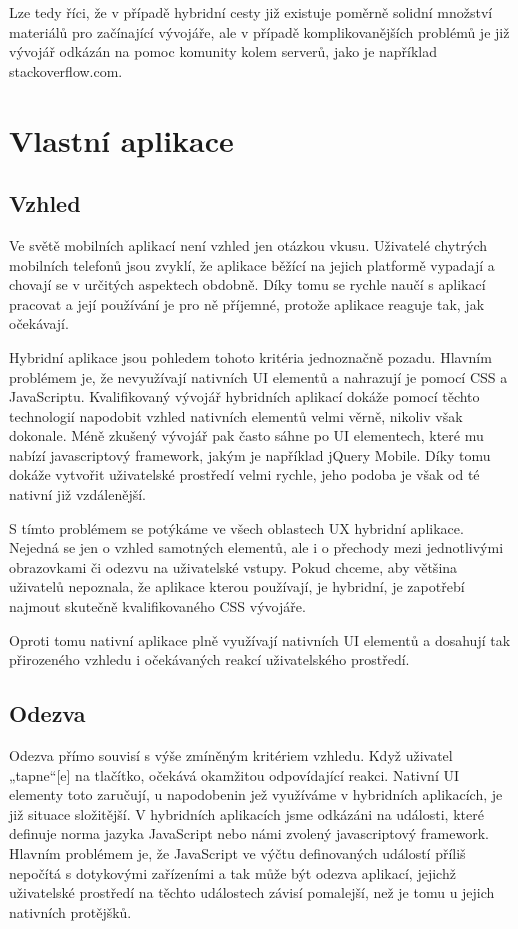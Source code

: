 Lze tedy říci, že v případě hybridní cesty již existuje poměrně solidní množství materiálů pro začínající vývojáře, ale v případě komplikovanějších problémů je již vývojář odkázán na pomoc komunity kolem serverů, jako je například stackoverflow.com.

\section{Vlastní aplikace}
\subsection{Vzhled}
Ve světě mobilních aplikací není vzhled jen otázkou vkusu. Uživatelé chytrých mobilních telefonů jsou zvyklí, že aplikace běžící na jejich platformě vypadají a chovají se v určitých aspektech obdobně. Díky tomu se rychle naučí s aplikací pracovat a její používání je pro ně příjemné, protože aplikace reaguje tak, jak očekávají.

Hybridní aplikace jsou pohledem tohoto kritéria jednoznačně pozadu. Hlavním problémem je, že nevyužívají nativních UI elementů a nahrazují je pomocí CSS a JavaScriptu. Kvalifikovaný vývojář hybridních aplikací dokáže pomocí těchto technologií napodobit vzhled nativních elementů velmi věrně, nikoliv však dokonale. Méně zkušený vývojář pak často sáhne po UI elementech, které mu nabízí javascriptový framework, jakým je například jQuery Mobile. Díky tomu dokáže vytvořit uživatelské prostředí velmi rychle, jeho podoba je však od té nativní již vzdálenější.

S tímto problémem se potýkáme ve všech oblastech UX hybridní aplikace. Nejedná se jen o vzhled samotných elementů, ale i o přechody mezi jednotlivými obrazovkami či odezvu na uživatelské vstupy. Pokud chceme, aby většina uživatelů nepoznala, že aplikace kterou používají, je hybridní, je zapotřebí najmout skutečně kvalifikovaného CSS vývojáře.

Oproti tomu nativní aplikace plně využívají nativních UI elementů a dosahují tak přirozeného vzhledu i očekávaných reakcí uživatelského prostředí.

\subsection{Odezva}
Odezva přímo souvisí s výše zmíněným kritériem vzhledu. Když uživatel „tapne“[e] na tlačítko, očekává okamžitou odpovídající reakci. Nativní UI elementy toto zaručují, u napodobenin jež využíváme v hybridních aplikacích, je již situace složitější. V hybridních aplikacích jsme odkázáni na události, které definuje norma jazyka JavaScript nebo námi zvolený javascriptový framework. Hlavním problémem je, že JavaScript ve výčtu definovaných událostí příliš nepočítá s dotykovými zařízeními a tak může být odezva aplikací, jejichž uživatelské prostředí na těchto událostech závisí pomalejší, než je tomu u jejich nativních protějšků.


